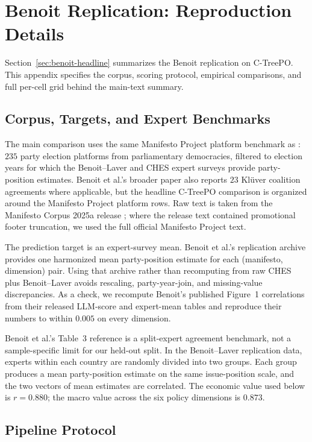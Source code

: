 \section{Benoit Replication: Reproduction Details}\label{app:benoit-replication}

Section~\ref{sec:benoit-headline} summarizes the Benoit replication on
C-TreePO. This appendix specifies the corpus, scoring protocol, empirical
comparisons, and full per-cell grid behind the main-text summary.

\subsection{Corpus, Targets, and Expert Benchmarks}

The main comparison uses the same Manifesto Project platform benchmark
as \citet{BenoitEtAl2025}: $235$ party election platforms from
parliamentary democracies, filtered to election years for which the
Benoit--Laver and CHES expert surveys provide party-position estimates.
Benoit et al.'s broader paper also reports $23$ Kl\"uver coalition
agreements where applicable, but the headline C-TreePO comparison is
organized around the Manifesto Project platform rows. Raw text is taken
from the Manifesto Corpus 2025a release \citep{ManifestoProject2025a};
where the release text contained promotional footer truncation, we used
the full official Manifesto Project text.

The prediction target is an expert-survey mean. Benoit et al.'s
replication archive provides one harmonized mean party-position estimate
for each (manifesto, dimension) pair. Using that archive rather than
recomputing from raw CHES plus Benoit--Laver avoids rescaling,
party-year-join, and missing-value discrepancies. As a check, we
recompute Benoit's published Figure~1 correlations from their released
LLM-score and expert-mean tables and reproduce their numbers to within
$0.005$ on every dimension.

Benoit et al.'s Table~3 reference is a split-expert agreement
benchmark, not a sample-specific limit for our held-out split. In the
Benoit--Laver replication data, experts within each country are randomly
divided into two groups. Each group produces a mean party-position
estimate on the same issue-position scale, and the two vectors of mean
estimates are correlated. The economic value used below is
$r = 0.880$; the macro value across the six policy dimensions is
$0.873$.

\subsection{Pipeline Protocol}

